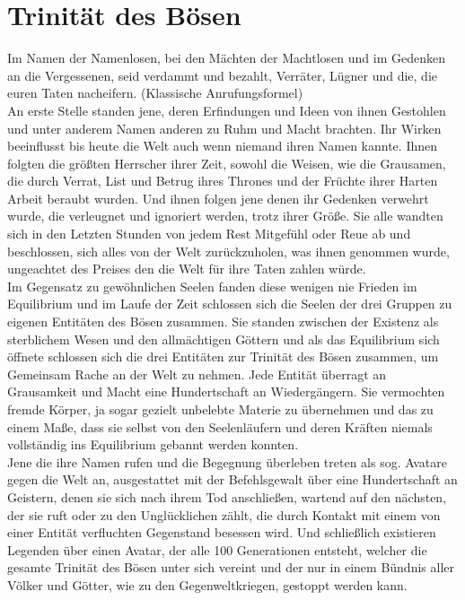 \documentclass[a4paper,12pt,oneside]{book}
\begin{document}
\section{Trinität des Bösen}
Im Namen der Namenlosen, bei den Mächten der Machtlosen und im Gedenken an die Vergessenen, seid verdammt und bezahlt, Verräter, Lügner und die, die euren Taten nacheifern. (Klassische Anrufungsformel)
\\An erste Stelle standen jene, deren Erfindungen und Ideen von ihnen Gestohlen und unter anderem Namen anderen zu Ruhm und Macht brachten. Ihr Wirken beeinflusst bis heute die Welt auch wenn niemand ihren Namen kannte. Ihnen folgten die größten Herrscher ihrer Zeit, sowohl die Weisen, wie die Grausamen, die durch Verrat, List und Betrug ihres Thrones und der Früchte ihrer Harten Arbeit beraubt wurden. Und ihnen folgen jene denen ihr Gedenken verwehrt wurde, die verleugnet und ignoriert werden, trotz ihrer Größe. Sie alle wandten sich in den Letzten Stunden von jedem Rest Mitgefühl oder Reue ab und beschlossen, sich alles von der Welt zurückzuholen, was ihnen genommen wurde, ungeachtet des Preises den die Welt für ihre Taten zahlen würde.
\\Im Gegensatz zu gewöhnlichen Seelen fanden diese wenigen nie Frieden im Equilibrium und im Laufe der Zeit schlossen sich die Seelen der drei Gruppen zu eigenen Entitäten des Bösen zusammen. Sie standen zwischen der Existenz als sterblichem Wesen und den allmächtigen Göttern und als das Equilibrium sich öffnete schlossen sich die drei Entitäten zur Trinität des Bösen zusammen, um Gemeinsam Rache an der Welt zu nehmen. Jede Entität überragt an Grausamkeit und Macht eine Hundertschaft an Wiedergängern. Sie vermochten fremde Körper, ja sogar gezielt unbelebte Materie zu übernehmen und das zu einem Maße, dass sie selbst von den Seelenläufern und deren Kräften niemals vollständig ins Equilibrium gebannt werden konnten.
\\Jene die ihre Namen rufen und die Begegnung überleben treten als sog. Avatare gegen die Welt an, ausgestattet mit der Befehlsgewalt über eine Hundertschaft an Geistern, denen sie sich nach ihrem Tod anschließen, wartend auf den nächsten, der sie ruft oder zu den Unglücklichen zählt, die durch Kontakt mit einem von einer Entität verfluchten Gegenstand besessen wird. Und schließlich existieren Legenden über einen Avatar, der alle 100 Generationen entsteht, welcher die gesamte Trinität des Bösen unter sich vereint und der nur in einem Bündnis aller Völker und Götter, wie zu den Gegenweltkriegen, gestoppt werden kann.
\end{document}
